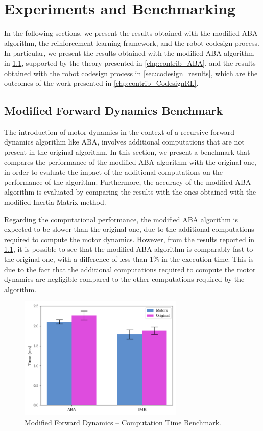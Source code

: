 \chapter{Experiments and Benchmarking}
\label{chp:contrib_ResultsDiscussion}

In the following sections, we present the results obtained with the modified \ac{ABA} algorithm, the reinforcement learning framework, and the robot codesign process. In particular, we present the results obtained with the modified \ac{ABA} algorithm in \cref{sec:results_fd_aba}, supported by the theory presented in \cref{chp:contrib_ABA},
and the results obtained with the robot codesign process in \cref{sec:codesign_results}, which are the outcomes of the work presented in \cref{chp:contrib_CodesignRL}.

\section{Modified Forward Dynamics Benchmark}
\label{sec:results_fd_aba}

The introduction of motor dynamics in the context of a recursive forward dynamics algorithm like \ac{ABA}, involves additional computations that are not present in the original algorithm. In this section, we present a benchmark that compares the performance of the modified \ac{ABA} algorithm with the original one, in order to evaluate the impact of the additional computations on the performance of the algorithm. Furthermore, the accuracy of the modified \ac{ABA} algorithm is evaluated by comparing the results with the ones obtained with the modified Inertia-Matrix method.

Regarding the computational performance, the modified \ac{ABA} algorithm is expected to be slower than the original one, due to the additional computations required to compute the motor dynamics. However, from the results reported in \cref{fig:fd_benchmark}, it is possible to see that the modified \ac{ABA} algorithm is comparably fast to the original one, with a difference of less than $1\%$ in the execution time. This is due to the fact that the additional computations required to compute the motor dynamics are negligible compared to the other computations required by the algorithm.

\begin{figure}
    \centering
    \caption{Modified Forward Dynamics -- Computation Time Benchmark.}
    \label{fig:fd_benchmark}
    \includegraphics[width=0.7\textwidth]{Images/Results/time_comparison_aba.png}
\end{figure}

